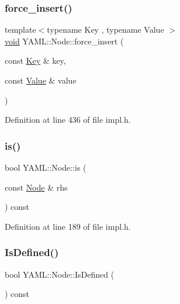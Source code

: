 \subsubsection{\texorpdfstring{force\_insert()}{force\_insert()}}
{\footnotesize\ttfamily template$<$typename Key , typename Value $>$ \\
\mbox{\hyperlink{glad_8h_a950fc91edb4504f62f1c577bf4727c29}{void}} Y\+A\+M\+L\+::\+Node\+::force\+\_\+insert (\begin{DoxyParamCaption}\item[{const \mbox{\hyperlink{namespace_y_a_m_l_a67c320aa50d3de7ecba1d0b8775dd684a1af533fc24b0311b8c4d5ac2870283aa}{Key}} \&}]{key,  }\item[{const \mbox{\hyperlink{namespace_y_a_m_l_a67c320aa50d3de7ecba1d0b8775dd684a0d29a86853d6a9cfe0241ab7ea8da97c}{Value}} \&}]{value }\end{DoxyParamCaption})\hspace{0.3cm}{\ttfamily [inline]}}



Definition at line 436 of file impl.\+h.

\mbox{\label{class_y_a_m_l_1_1_node_a35acb7bdd8751c583394e743f47908c7}} 
\subsubsection{\texorpdfstring{is()}{is()}}
{\footnotesize\ttfamily bool Y\+A\+M\+L\+::\+Node\+::is (\begin{DoxyParamCaption}\item[{const \mbox{\hyperlink{class_y_a_m_l_1_1_node}{Node}} \&}]{rhs }\end{DoxyParamCaption}) const\hspace{0.3cm}{\ttfamily [inline]}}



Definition at line 189 of file impl.\+h.

\mbox{\label{class_y_a_m_l_1_1_node_a45f02d95f0dbbd223c36045769787897}} 
\subsubsection{\texorpdfstring{IsDefined()}{IsDefined()}}
{\footnotesize\ttfamily bool Y\+A\+M\+L\+::\+Node\+::\+Is\+Defined (\begin{DoxyParamCaption}{ }\end{DoxyParamCaption}) const\hspace{0.3cm}{\ttfamily [inline]}}



